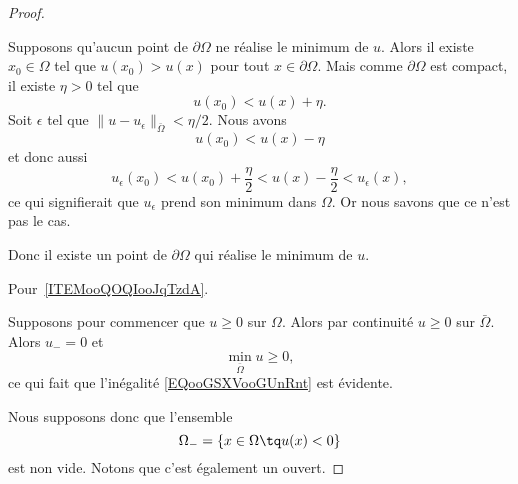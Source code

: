 \begin{proof}
\begin{subproof}
		Supposons qu'aucun point de \( \partial \Omega\) ne réalise le minimum de \( u\). Alors il existe \( x_0\in \Omega\) tel que \( u(x_0)>u(x)\) pour tout \( x\in \partial \Omega\). Mais comme \( \partial\Omega\) est compact, il existe \( \eta>0\) tel que
		\begin{equation}
			u(x_0)<u(x)+\eta.
		\end{equation}
		Soit \( \epsilon\) tel que \( \| u-u_{\epsilon} \|_{\bar \Omega}< \eta/2\). Nous avons
		\begin{equation}
			u(x_0)<u(x)-\eta
		\end{equation}
		et donc aussi
		\begin{equation}
			u_{\epsilon}(x_0)<u(x_0)+\frac{ \eta }{2}<u(x)-\frac{ \eta }{2}<u_{\epsilon}(x),
		\end{equation}
		ce qui signifierait que \( u_{\epsilon}\) prend son minimum dans \( \Omega\). Or nous savons que ce n'est pas le cas.

		Donc il existe un point de \( \partial\Omega\) qui réalise le minimum de \( u\).

	\end{subproof}

	Pour~\ref{ITEMooQOQIooJqTzdA}.

	Supposons pour commencer que \( u\geq 0\) sur \( \Omega\). Alors par continuité \( u\geq 0\) sur \( \bar \Omega\). Alors \( u_-=0\) et
	\begin{equation}
		\min_{\bar\Omega}u\geq 0,
	\end{equation}
	ce qui fait que l'inégalité \eqref{EQooGSXVooGUnRnt} est évidente.

	Nous supposons donc que l'ensemble
	\begin{equation}
		\Omega_-=\{ x\in \Omega\tq u(x)<0 \}
	\end{equation}
	est non vide. Notons que c'est également un ouvert.


\end{proof}
